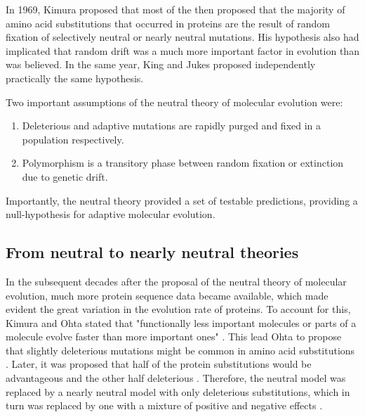 In 1969, Kimura \citep{kimura1969rate} proposed that most of the  \citep{kimura1969rate} then proposed that the majority of amino acid substitutions that occurred in proteins are the result of random fixation of selectively neutral or nearly neutral mutations. His hypothesis also had implicated that random drift was a much more important factor in evolution than was believed.
In the same year, King and Jukes \citep{King1969} proposed independently practically the same hypothesis.

Two important assumptions of the neutral theory of molecular evolution were:

\begin{enumerate}
\item Deleterious and adaptive mutations are rapidly purged and fixed in a population respectively.
\item Polymorphism is a transitory phase between random fixation or extinction due to genetic drift.
\end{enumerate}

Importantly, the neutral theory provided a set of testable predictions, providing a null-hypothesis for adaptive molecular evolution.

\subsection{From neutral to nearly neutral theories}

In the subsequent decades after the proposal of the neutral theory of molecular evolution, much more protein sequence data became available, which made evident the great variation in the evolution rate of proteins.
To account for this, Kimura and Ohta stated that "functionally less important molecules or parts of a molecule evolve faster than more important ones" \citep{Kimura1974}.
This lead Ohta to propose that slightly deleterious mutations might be common in amino acid substitutions  \citep{Ohta1973}. Later, it was proposed that half of the protein substitutions would be advantageous and the other half deleterious \citep{gillespie1994causes}.
Therefore, the neutral model was replaced by a nearly neutral model with only deleterious substitutions, which in turn was replaced by one with a mixture of positive and negative effects \citep{Ohta1996}.

